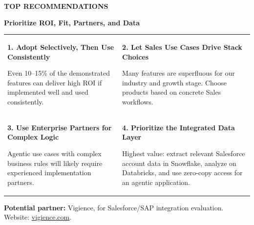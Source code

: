 \documentclass[11pt]{article}
\newcommand{\slide}[1]{%
  \clearpage
  \begin{tcolorbox}[
    enhanced,
    colback=white,
    colframe=line,
    boxrule=0.6pt,
    arc=4pt,
    width=\textwidth,
    height=9.0in,
    left=14pt,
    right=14pt,
    top=14pt,
    bottom=14pt
  ]
  #1
  \end{tcolorbox}
}
\newcommand{\kicker}[1]{\textcolor{dark}{\footnotesize\bfseries\MakeUppercase{#1}}\vspace{6pt}}
\newcommand{\slidetitle}[1]{{\color{ink}\LARGE\bfseries #1}\par\vspace{12pt}}
\newcommand{\boxtitle}[1]{{\bfseries #1}\par}
\newcommand{\smallmuted}[1]{{\small\textcolor{muted}{#1}}}
\begin{document}
\slide{
  \kicker{Top Recommendations}\par
  \slidetitle{Prioritize ROI, Fit, Partners, and Data}
  \begin{tabularx}{\textwidth}{XX}
    \begin{plainbox}
      \boxtitle{1. Adopt Selectively, Then Use Consistently}
      \smallmuted{Even 10--15\% of the demonstrated features can deliver high ROI if implemented well and used consistently.}
    \end{plainbox}
    &
    \begin{plainbox}
      \boxtitle{2. Let Sales Use Cases Drive Stack Choices}
      \smallmuted{Many features are superfluous for our industry and growth stage. Choose products based on concrete Sales workflows.}
    \end{plainbox}
    \\[10pt]
    \begin{plainbox}
      \boxtitle{3. Use Enterprise Partners for Complex Logic}
      \smallmuted{Agentic use cases with complex business rules will likely require experienced implementation partners.}
    \end{plainbox}
    &
    \begin{plainbox}
      \boxtitle{4. Prioritize the Integrated Data Layer}
      \smallmuted{Highest value: extract relevant Salesforce account data in Snowflake, analyze on Databricks, and use zero-copy access for an agentic application.}
    \end{plainbox}
  \end{tabularx}
  \vfill
  \begin{calloutbox}
    \textbf{Potential partner:} Vigience, for Salesforce/SAP integration evaluation. Website: \href{https://www.vigience.com/}{vigience.com}.
  \end{calloutbox}
}
\end{document}
